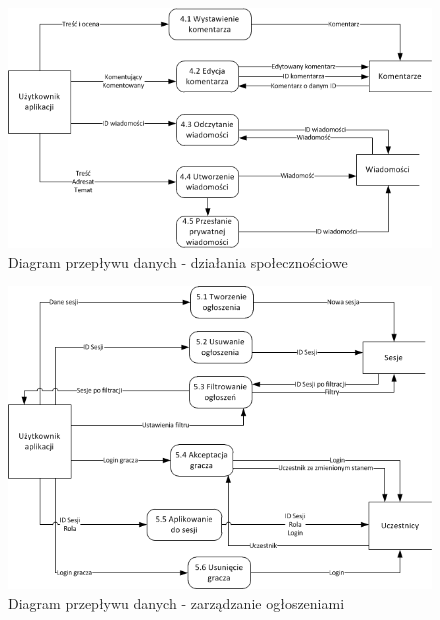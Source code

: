\begin{figure}[h!]
\begin{center}
\centerline{\includegraphics[scale=1]{./img/DFD-social.png}}
\caption[Diagram przepływu danych - działania społecznościowe]{Diagram przepływu danych - działania społecznościowe}
\label{fig:DFD-social}
\end{center}
\end{figure}

\begin{figure}[h!]
\begin{center}
\centerline{\includegraphics[scale=1]{./img/DFD-announcements.png}}
\caption[Diagram przepływu danych - zarządzanie ogłoszeniami]{Diagram przepływu danych - zarządzanie ogłoszeniami}
\label{fig:DFD-announcements}
\end{center}
\end{figure}

